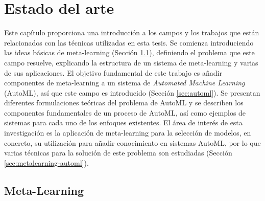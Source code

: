 \chapter{Estado del arte }\label{chapter:review}

 
Este capítulo proporciona una introducción a los campos y los trabajos que están relacionados con las técnicas utilizadas en esta tesis. Se comienza introduciendo las ideas básicas de meta-learning (Sección \ref{sec:metalearning}), definiendo el problema que este campo resuelve, explicando la estructura de un sistema de meta-learning y varias de sus aplicaciones. El objetivo fundamental de este trabajo es añadir componentes de meta-learning a un sistema de \textit{Automated Machine Learning} (AutoML), así que este campo es introducido (Sección \ref{sec:automl}). Se presentan diferentes formulaciones teóricas del problema de AutoML y se describen los componentes fundamentales de un proceso de AutoML, así como ejemplos de sistemas para cada uno de los enfoques existentes. El área de interés de esta investigación es la aplicación de meta-learning para la selección de modelos, en concreto, su utilización para añadir conocimiento en sistemas AutoML, por lo que varias técnicas para la solución de este problema son estudiadas (Sección \ref{sec:metalearning-automl}).

\section{Meta-Learning}\label{sec:metalearning}

